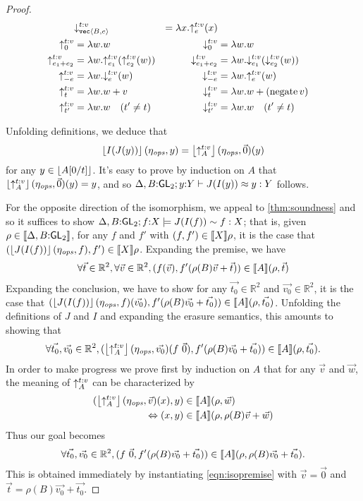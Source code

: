 \begin{proof}
\begin{align*}
&
\mathord\downarrow_{\textup{\texttt{vec}}\langle B,e \rangle}^{t\mathord:v} &= \lambda x. \mathord\uparrow_{e}^{t\mathord:v} (x)
\\
\mathord\uparrow_{0}^{t\mathord:v} &= \lambda w.w
&
\mathord\downarrow_{0}^{t\mathord:v} &= \lambda w.w
\\ 
\mathord\uparrow_{e_1+e_2}^{t\mathord:v} &= \lambda w.\mathord\uparrow_{e_1}^{t\mathord:v}(\mathord\uparrow_{e_2}^{t\mathord:v}(w))
&
\mathord\downarrow_{e_1+e_2}^{t\mathord:v} &= \lambda w.\mathord\downarrow_{e_1}^{t\mathord:v}(\mathord\downarrow_{e_2}^{t\mathord:v}(w))
\\
\mathord\uparrow_{-e}^{t\mathord:v} &= \lambda w.\mathord\downarrow_{e}^{t\mathord:v} (w)
&
\mathord\downarrow_{-e}^{t\mathord:v} &= \lambda w.\mathord\uparrow_{e}^{t\mathord:v} (w)
\\
\mathord\uparrow_{t}^{t\mathord:v} &= \lambda w.w + v 
&
\mathord\downarrow_{t}^{t\mathord:v} &= \lambda w.w + (\mathrm{negate}\, v)
\\
\mathord\uparrow_{t'}^{t\mathord:v} &= \lambda w.w\quad(t'\neq t)
&
\mathord\downarrow_{t'}^{t\mathord:v} &= \lambda w.w\quad(t'\neq t)
\end{align*}


Unfolding definitions, we deduce that
\[
\left\lfloor{I(J(y))}\right\rfloor(\eta_{\mathit{ops}},y) = \left\lfloor{\mathord\uparrow_{A}^{t\mathord:v}}\right\rfloor(\eta_{\mathit{ops}},\vec 0)(y)
\]
for any $y \in \left\lfloor{A[0/t]}\right\rfloor$. It's easy to prove by induction on $A$
that $\left\lfloor{\mathord\uparrow_{A}^{t\mathord:v}}\right\rfloor(\eta_{\mathit{ops}},\vec 0)(y) = y$, and so
${\Delta,B\mathord:\mathsf{GL}_2};{y\mathord:Y}\vdash{J(I(y))}\approx{y}:{Y}$ follows.

For the opposite direction of the isomorphism, we appeal to 
\autoref{thm:soundness} and so it suffices to show
${\Delta,B\mathord:\mathsf{GL}_2};{f\mathord:X}\models{J(I(f))}\sim{f}:{X}$; that
is, given $\rho\in\llbracket \Delta,B\mathord:\mathsf{GL}_2 \rrbracket$, for any $f$ and $f'$ with
$(f,f')\in\llbracket X \rrbracket\rho$, it is the case that 
$(\left\lfloor{J(I(f))}\right\rfloor(\eta_{\mathit{ops}},f), f')\in\llbracket X \rrbracket\rho$.
Expanding the premise, we have
\begin{eqnarray}\label{eqn:isopremise}
\forall \vec{t}\in \mathbb R ^ 2,
\forall \vec{v}\in \mathbb R ^ 2,
(f(\vec{v}),f'(\rho(B)\vec{v} + \vec{t}))\in\llbracket A \rrbracket (\rho,\vec{t})
\end{eqnarray}
Expanding the conclusion, we have to show for any
$\vec{t_0}\in\mathbb R^2$ and $\vec{v_0}\in\mathbb R^2$, it is the case that
$(\left\lfloor{J(I(f))}\right\rfloor(\eta_{\mathit{ops}},f)(\vec{v_0}),f'(\rho(B)\vec{v_0} + \vec{t_0}))\in\llbracket A \rrbracket (\rho,\vec{t_0})$.
Unfolding the definitions of $J$ and $I$ and expanding the erasure semantics, 
this amounts to showing that
\[
\forall \vec{t_0},\vec{v_0}\in \mathbb R ^ 2,
(\left\lfloor{\mathord\uparrow_{A}^{t\mathord:v}}\right\rfloor(\eta_{\mathit{ops}},\vec{v_0})(f\ \vec 0),f'(\rho(B)\vec{v_0} + \vec{t_0}))\in\llbracket A \rrbracket (\rho,\vec{t_0}).
\]
In order to make progress we prove first by induction on $A$ that for any $\vec v$ and $\vec w$, 
the meaning of $\mathord\uparrow_{A}^{t\mathord:v}$ can be characterized by
\begin{align*}
(\left\lfloor{\mathord\uparrow_{A}^{t\mathord:v}}\right\rfloor(\eta_{\mathit{ops}},\vec{v})(x),y)&\in\llbracket A \rrbracket (\rho,\vec{w})
\\\Leftrightarrow 
(x,y)&\in\llbracket A \rrbracket (\rho,\rho(B)\vec{v} + \vec{w})
\end{align*}
Thus our goal becomes
\[
\forall \vec{t_0},\vec{v_0}\in \mathbb R ^ 2,
(f\ \vec 0,f'(\rho(B)\vec{v_0} + \vec{t_0}))\in\llbracket A \rrbracket (\rho,\rho(B)\vec{v_0} + \vec{t_0}).
\]
This is obtained immediately by instantiating \autoref{eqn:isopremise}
with $\vec{v}=\vec 0$ and $\vec{t}=\rho(B)\vec{v_0} + \vec{t_0}$.
\end{proof}

